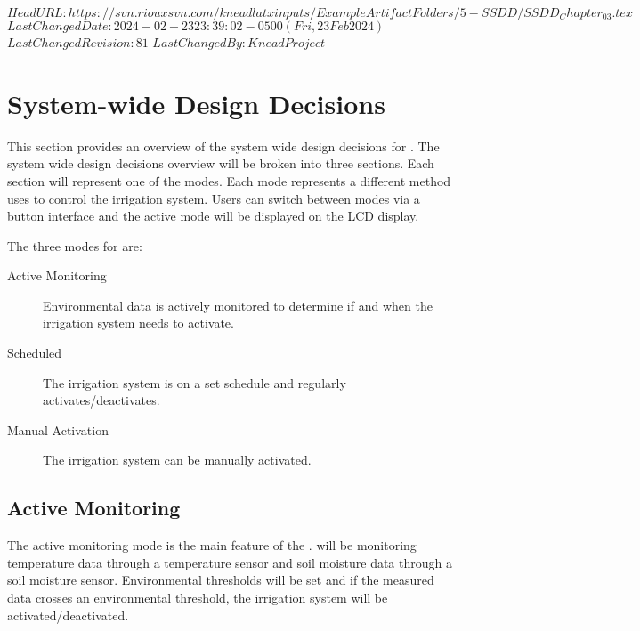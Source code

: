 \svnidlong
{$HeadURL: https://svn.riouxsvn.com/kneadlatxinputs/ExampleArtifactFolders/5-SSDD/SSDD_Chapter_03.tex $}
{$LastChangedDate: 2024-02-23 23:39:02 -0500 (Fri, 23 Feb 2024) $}
{$LastChangedRevision: 81 $}
{$LastChangedBy: KneadProject $}


\chapter{System-wide Design Decisions}
\label{loc:SystemWideDesignDecisions}
% 

This section provides an overview of the system wide design decisions for \ThisSys. The system wide design decisions overview will be broken into three sections.
Each section will represent one of the \ThisSys modes. Each mode represents a different method \ThisSys uses to control the irrigation system. Users can switch between modes via a button interface
and the active mode will be displayed on the \ThisSys LCD display.

The three modes for \ThisSys are: 
\begin{description}
    \item[Active Monitoring] Environmental data is actively monitored to determine if and when the \ThisSys irrigation system needs to activate.
    \item[Scheduled] The \ThisSys irrigation system is on a set schedule and regularly activates/deactivates.
    \item[Manual Activation] The \ThisSys irrigation system can be manually activated.
\end{description}

\section{Active Monitoring}
\label{loc:activeMonitoring}

The active monitoring mode is the main feature of the \ThisSystem. \ThisSys will be monitoring temperature data through a temperature sensor and soil moisture data through a soil moisture sensor.
Environmental thresholds will be set and if the measured data crosses an environmental threshold, the \ThisSys irrigation system will be activated/deactivated.

